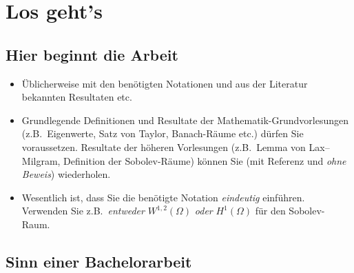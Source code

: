 \documentclass[a4paper,11pt,bibliography=totoc,listof=totoc,headinclude=true,cleardoublepage=empty,oneside]{scrbook}
\begin{document}
\chapter{Los geht's}
\label{chapter:content}

\section{Hier beginnt die Arbeit}

{\color{change}
\begin{itemize}
\item Üblicherweise mit den benötigten Notationen und aus der Literatur bekannten Resultaten etc.
\item Grundlegende Definitionen und Resultate der Mathematik-Grundvorlesungen (z.B.\ Eigenwerte, Satz von Taylor, Banach-Räume etc.) dürfen Sie voraussetzen. Resultate der höheren Vorlesungen (z.B.\ Lemma von Lax--Milgram, Definition der Sobolev-Räume) können Sie (mit Referenz und \emph{ohne Beweis}) wiederholen.
\item Wesentlich ist, dass Sie die benötigte Notation \emph{eindeutig} einführen. Verwenden Sie z.B.\ \emph{entweder} $W^{1,2}(\Omega)$ \emph{oder} $H^1(\Omega)$ für den Sobolev-Raum.
\end{itemize}
}

\section{Sinn einer Bachelorarbeit}
\end{document}
